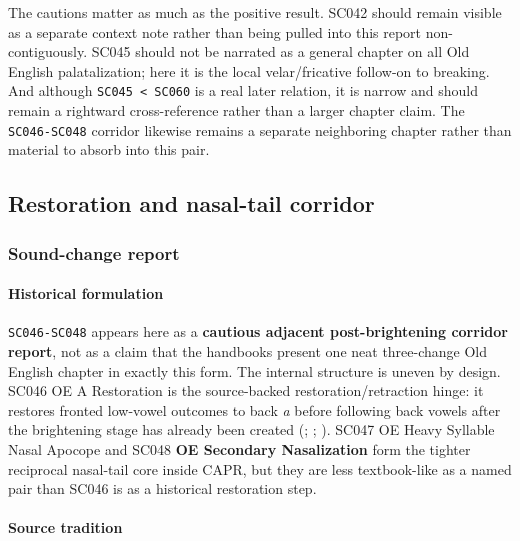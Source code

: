 \documentclass[
  british,
  a4paper,
]{article}
\begin{document}
The cautions matter as much as the positive result. SC042 should remain
visible as a separate context note rather than being pulled into this
report non-contiguously. SC045 should not be narrated as a general
chapter on all Old English palatalization; here it is the local
velar/fricative follow-on to breaking. And although
\texttt{SC045\ \textless{}\ SC060} is a real later relation, it is
narrow and should remain a rightward cross-reference rather than a
larger chapter claim. The \texttt{SC046-SC048} corridor likewise remains
a separate neighboring chapter rather than material to absorb into this
pair.

\subsection{Restoration and nasal-tail
corridor}\label{restoration-and-nasal-tail-corridor}

\subsubsection{Sound-change report}\label{sound-change-report-29}

\paragraph{Historical formulation}\label{historical-formulation-29}

\texttt{SC046-SC048} appears here as a \textbf{cautious adjacent
post-brightening corridor report}, not as a claim that the handbooks
present one neat three-change Old English chapter in exactly this form.
The internal structure is uneven by design. SC046 OE A Restoration is
the source-backed restoration/retraction hinge: it restores fronted
low-vowel outcomes to back \emph{a} before following back vowels after
the brightening stage has already been created
(;
;
). SC047 OE Heavy Syllable
Nasal Apocope and SC048 \textbf{OE Secondary Nasalization} form the
tighter reciprocal nasal-tail core inside CAPR, but they are less
textbook-like as a named pair than SC046 is as a historical restoration
step.

\paragraph{Source tradition}\label{source-tradition-29}
\end{document}
